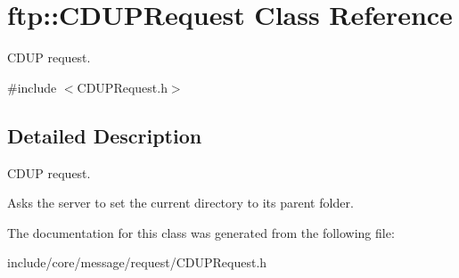 \hypertarget{classftp_1_1_c_d_u_p_request}{\section{ftp\-:\-:C\-D\-U\-P\-Request Class Reference}
\label{classftp_1_1_c_d_u_p_request}
}


C\-D\-U\-P request.  




{\ttfamily \#include $<$C\-D\-U\-P\-Request.\-h$>$}



\subsection{Detailed Description}
C\-D\-U\-P request. 

Asks the server to set the current directory to its parent folder. 

The documentation for this class was generated from the following file\-:\begin{DoxyCompactItemize}
\item 
include/core/message/request/C\-D\-U\-P\-Request.\-h\end{DoxyCompactItemize}
